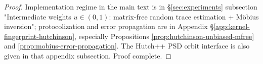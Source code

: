 \begin{proof}[Proof]
Implementation regime in the main text is in \S\ref{sec:experiments} subsection "Intermediate weights \(u\in(0,1)\): matrix-free random trace estimation + Möbius inversion";
protocolization and error propagation are in Appendix \S\ref{app:kernel-fingerprint-hutchinson}, especially Propositions \ref{prop:hutchinson-unbiased-mfree} and \ref{prop:mobius-error-propagation}.
The Hutch++ PSD orbit interface is also given in that appendix subsection. Proof complete.
\end{proof}



